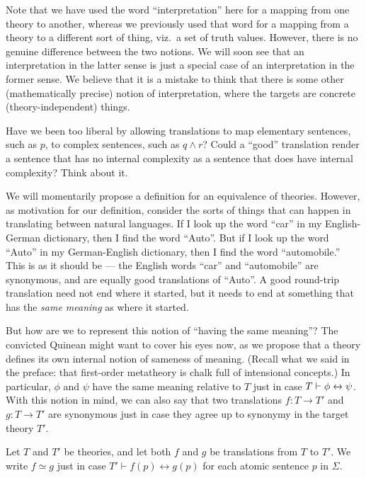Note that we have used the word ``interpretation'' here for a mapping
from one theory to another, whereas we previously used that word for a
mapping from a theory to a different sort of thing, viz.\ a set of
truth values.  However, there is no genuine difference between the two
notions.  We will soon see that an interpretation in the latter sense
is just a special case of an interpretation in the former sense.  We
believe that it is a mistake to think that there is some other
(mathematically precise) notion of interpretation, where the targets
are concrete (theory-independent) things.

\begin{disc} Have we been too liberal by allowing translations to map
  elementary sentences, such as $p$, to complex sentences, such as
  $q\wedge r$?  Could a ``good'' translation render a sentence that
  has no internal complexity as a sentence that does have internal
  complexity?  Think about it.  \end{disc}

We will momentarily propose a definition for an equivalence of
theories.  However, as motivation for our definition, consider the
sorts of things that can happen in translating between natural
languages.  If I look up the word ``car'' in my English-German
dictionary, then I find the word ``Auto''.  But if I look up the word
``Auto'' in my German-English dictionary, then I find the word
``automobile.''  This is as it should be --- the English words ``car''
and ``automobile'' are synonymous, and are equally good translations
of ``Auto''.  A good round-trip translation need not end where it
started, but it needs to end at something that has the {\it same
  meaning} as where it started.

But how are we to represent this notion of ``having the same
meaning''?  The convicted Quinean might want to cover his eyes now, as
we propose that a theory defines its own internal notion of sameness
of meaning.  (Recall what we said in the preface: that first-order
metatheory is chalk full of intensional concepts.)  In particular,
$\phi$ and $\psi$ have the same meaning relative to $T$ just in case
$T\vdash \phi\leftrightarrow\psi$.  With this notion in mind, we can also say
that two translations $f:T\to T'$ and $g:T\to T'$ are synonymous just
in case they agree up to synonymy in the target theory $T'$.

\begin{defn} Let $T$ and $T'$ be theories,
  and let both $f$ and $g$ be translations from $T$ to $T'$.  We write
  $f\simeq g$ just in case $T'\vdash f(p)\leftrightarrow g(p)$ for
  each atomic sentence $p$ in $\Sigma$.  \end{defn}

